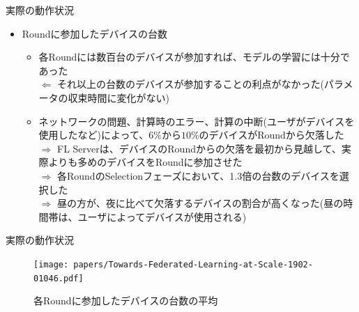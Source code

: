 \documentclass[dvipdfmx,notheorems,t]{beamer}
\begin{document}
\begin{frame}{実際の動作状況}

\begin{itemize}
	\item Roundに参加したデバイスの台数
	\begin{itemize}
		\item 各Roundには数百台のデバイスが参加すれば、モデルの学習には十分であった \\
		$\Leftarrow$ それ以上の台数のデバイスが参加することの利点がなかった(パラメータの収束時間に変化がない)
		\newline
		
		\item ネットワークの問題、計算時のエラー、計算の中断(ユーザがデバイスを使用したなど)によって、$6\%$から$10\%$のデバイスがRoundから欠落した \\
		$\Rightarrow$ FL Serverは、デバイスのRoundからの欠落を最初から見越して、実際よりも多めのデバイスをRoundに参加させた \\
		$\Rightarrow$ 各RoundのSelectionフェーズにおいて、1.3倍の台数のデバイスを選択した \\
		$\Rightarrow$ 昼の方が、夜に比べて欠落するデバイスの割合が高くなった(昼の時間帯は、ユーザによってデバイスが使用される)
	\end{itemize}
\end{itemize}

\end{frame}

\begin{frame}{実際の動作状況}

\begin{figure}
	\centering
	\texttt{[image: papers/Towards-Federated-Learning-at-Scale-1902-01046.pdf]}
	\caption{各Roundに参加したデバイスの台数の平均~\cite{DBLP:journals/corr/abs-1902-01046}}
	\label{fig:devices-per-round}
\end{figure}

\end{frame}
\end{document}
